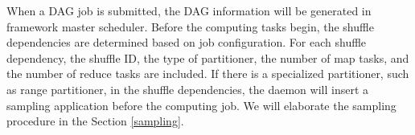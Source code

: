 {\color{blue}
When a DAG job is submitted, the DAG information will be generated in framework master scheduler. 
Before the computing tasks begin, the shuffle dependencies are determined based on job configuration.
}
For each shuffle dependency, the shuffle ID, the type of partitioner, the number of map tasks, and the number of reduce tasks are included.  If there is a specialized partitioner, such as range partitioner, in the shuffle dependencies, the daemon will insert a sampling application before the {\color{blue}computing job}. We will elaborate the sampling procedure in the Section \ref{sampling}.
